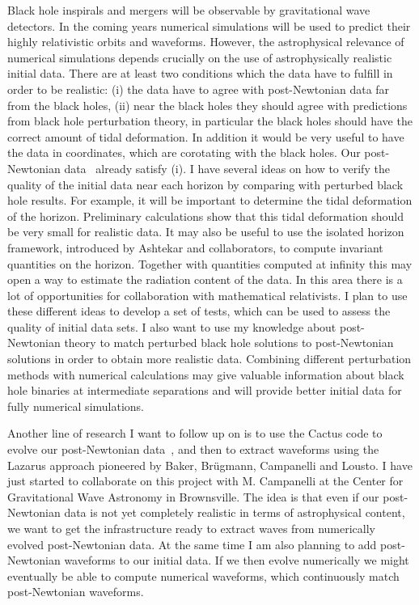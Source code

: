 \documentclass[11pt]{article}
\begin{document}
\begin{spacing}{0.95}
Black hole inspirals and mergers will be observable by gravitational wave
detectors. In the coming years numerical simulations will be used to predict
their highly relativistic orbits and waveforms. However, the astrophysical
relevance of numerical simulations depends crucially on the use of
astrophysically realistic initial data. There are at least two conditions
which the data have to fulfill in order to be realistic: (i) the data have
to agree with post-Newtonian data far from the black holes, (ii) near the
black holes they should agree with predictions from black hole perturbation
theory, in particular the black holes should have the correct amount of
tidal deformation. In addition it would be very useful to have the data in
coordinates, which are corotating with the black holes. Our post-Newtonian
data~\cite{Tichy02} already satisfy (i). I have several ideas on how to
verify the quality of the initial data near each horizon by comparing with
perturbed black hole results. For example, it will be important to
determine the tidal deformation of the horizon. Preliminary calculations
show that this tidal deformation should be very small for realistic data. It
may also be useful to use the isolated horizon framework, introduced by
Ashtekar and collaborators, to compute invariant quantities on the horizon.
Together with quantities computed at infinity this may open a way to
estimate the radiation content of the data. In this area there is a lot of
opportunities for collaboration with mathematical relativists.  I plan to
use these different ideas to develop a set of tests, which can be used to
assess the quality of initial data sets. I also want to use my knowledge
about post-Newtonian theory to match perturbed black hole solutions to
post-Newtonian solutions in order to obtain more realistic data. 
Combining different perturbation methods with numerical calculations may
give valuable information about black hole binaries at intermediate
separations and will provide better initial data for fully numerical
simulations.

Another line of research I want to follow up on is to use the Cactus code
to evolve our post-Newtonian data~\cite{Tichy02}, and then to extract
waveforms using the Lazarus approach pioneered by Baker, Br\"ugmann,
Campanelli and Lousto. I have just started to collaborate on this project
with M. Campanelli at the Center for Gravitational Wave Astronomy in
Brownsville. The idea is that even if our post-Newtonian data is not yet
completely realistic in terms of astrophysical content, we want to get the
infrastructure ready to extract waves from numerically evolved
post-Newtonian data. At the same time I am also planning to add
post-Newtonian waveforms to our initial data. If we then evolve numerically
we might eventually be able to compute numerical waveforms, which
continuously match post-Newtonian waveforms.



\end{spacing}
\end{document}
